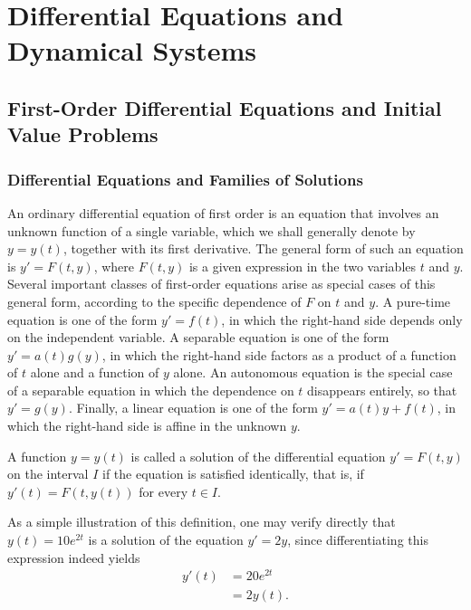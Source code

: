 \chapter{Differential Equations and Dynamical Systems}

\section{First-Order Differential Equations and Initial Value Problems}

\subsection{Differential Equations and Families of Solutions}

An ordinary differential equation of first order is an equation that involves an unknown function of a single variable, which we shall generally denote by $y = y(t)$, together with its first derivative. The general form of such an equation is $y' = F(t,y)$, where $F(t,y)$ is a given expression in the two variables $t$ and $y$. Several important classes of first-order equations arise as special cases of this general form, according to the specific dependence of $F$ on $t$ and $y$. A pure-time equation is one of the form $y' = f(t)$, in which the right-hand side depends only on the independent variable. A separable equation is one of the form $y' = a(t) g(y)$, in which the right-hand side factors as a product of a function of $t$ alone and a function of $y$ alone. An autonomous equation is the special case of a separable equation in which the dependence on $t$ disappears entirely, so that $y' = g(y)$. Finally, a linear equation is one of the form $y' = a(t) y + f(t)$, in which the right-hand side is affine in the unknown $y$.

\begin{definition}
A function $y = y(t)$ is called a solution of the differential equation $y' = F(t,y)$ on the interval $I$ if the equation is satisfied identically, that is, if $y'(t) = F(t, y(t))$ for every $t \in I$.
\end{definition}

As a simple illustration of this definition, one may verify directly that $y(t) = 10 e^{2t}$ is a solution of the equation $y' = 2y$, since differentiating this expression indeed yields
\[
\begin{aligned}
y'(t) &= 20 e^{2t} \\
&= 2 y(t).
\end{aligned}
\]

